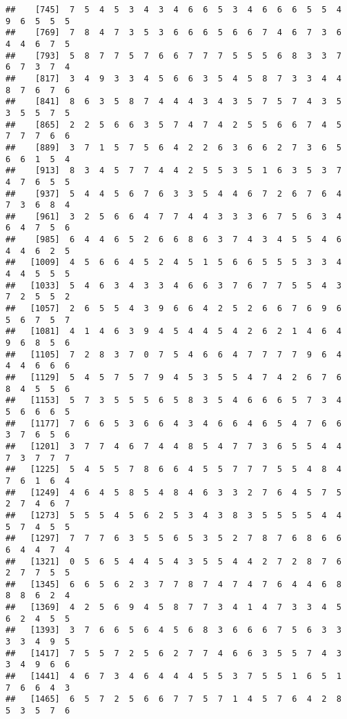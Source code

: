 \documentclass[
]{book}
\begin{document}
\begin{verbatim}
##    [745]  7  5  4  5  3  4  3  4  6  6  5  3  4  6  6  6  5  5  4  9  6  5  5  5
##    [769]  7  8  4  7  3  5  3  6  6  6  5  6  6  7  4  6  7  3  6  4  4  6  7  5
##    [793]  5  8  7  7  5  7  6  6  7  7  7  5  5  5  6  8  3  3  7  6  7  3  7  4
##    [817]  3  4  9  3  3  4  5  6  6  3  5  4  5  8  7  3  3  4  4  8  7  6  7  6
##    [841]  8  6  3  5  8  7  4  4  4  3  4  3  5  7  5  7  4  3  5  3  5  5  7  5
##    [865]  2  2  5  6  6  3  5  7  4  7  4  2  5  5  6  6  7  4  5  7  7  7  6  6
##    [889]  3  7  1  5  7  5  6  4  2  2  6  3  6  6  2  7  3  6  5  6  6  1  5  4
##    [913]  8  3  4  5  7  7  4  4  2  5  5  3  5  1  6  3  5  3  7  4  7  6  5  5
##    [937]  5  4  4  5  6  7  6  3  3  5  4  4  6  7  2  6  7  6  4  7  3  6  8  4
##    [961]  3  2  5  6  6  4  7  7  4  4  3  3  3  6  7  5  6  3  4  6  4  7  5  6
##    [985]  6  4  4  6  5  2  6  6  8  6  3  7  4  3  4  5  5  4  6  4  4  6  2  5
##   [1009]  4  5  6  6  4  5  2  4  5  1  5  6  6  5  5  5  3  3  4  4  4  5  5  5
##   [1033]  5  4  6  3  4  3  3  4  6  6  3  7  6  7  7  5  5  4  3  7  2  5  5  2
##   [1057]  2  6  5  5  4  3  9  6  6  4  2  5  2  6  6  7  6  9  6  5  6  7  5  7
##   [1081]  4  1  4  6  3  9  4  5  4  4  5  4  2  6  2  1  4  6  4  9  6  8  5  6
##   [1105]  7  2  8  3  7  0  7  5  4  6  6  4  7  7  7  7  9  6  4  4  4  6  6  6
##   [1129]  5  4  5  7  5  7  9  4  5  3  5  5  4  7  4  2  6  7  6  8  4  5  5  6
##   [1153]  5  7  3  5  5  5  6  5  8  3  5  4  6  6  6  5  7  3  4  5  6  6  6  5
##   [1177]  7  6  6  5  3  6  6  4  3  4  6  6  4  6  5  4  7  6  6  3  7  6  5  6
##   [1201]  3  7  7  4  6  7  4  4  8  5  4  7  7  3  6  5  5  4  4  7  3  7  7  7
##   [1225]  5  4  5  5  7  8  6  6  4  5  5  7  7  7  5  5  4  8  4  7  6  1  6  4
##   [1249]  4  6  4  5  8  5  4  8  4  6  3  3  2  7  6  4  5  7  5  2  7  4  6  7
##   [1273]  5  5  5  4  5  6  2  5  3  4  3  8  3  5  5  5  5  4  4  5  7  4  5  5
##   [1297]  7  7  7  6  3  5  5  6  5  3  5  2  7  8  7  6  8  6  6  6  4  4  7  4
##   [1321]  0  5  6  5  4  4  5  4  3  5  5  4  4  2  7  2  8  7  6  2  7  7  5  5
##   [1345]  6  6  5  6  2  3  7  7  8  7  4  7  4  7  6  4  4  6  8  8  8  6  2  4
##   [1369]  4  2  5  6  9  4  5  8  7  7  3  4  1  4  7  3  3  4  5  6  2  4  5  5
##   [1393]  3  7  6  6  5  6  4  5  6  8  3  6  6  6  7  5  6  3  3  3  3  4  9  5
##   [1417]  7  5  5  7  2  5  6  2  7  7  4  6  6  3  5  5  7  4  3  3  4  9  6  6
##   [1441]  4  6  7  3  4  6  4  4  4  5  5  3  7  5  5  1  6  5  1  7  6  6  4  3
##   [1465]  6  5  7  2  5  6  6  7  7  5  7  1  4  5  7  6  4  2  8  5  3  5  7  6

\end{verbatim}
\end{document}
